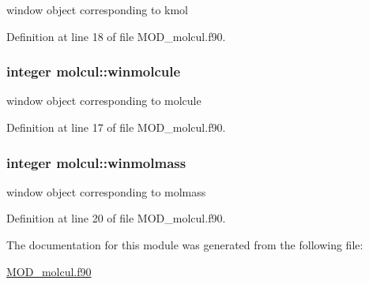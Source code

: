 window object corresponding to kmol 



Definition at line 18 of file M\-O\-D\-\_\-molcul.\-f90.

\hypertarget{classmolcul_a9d2b904765f02dba80da18d3649983d8}{
\subsubsection[{winmolcule}]{\setlength{\rightskip}{0pt plus 5cm}integer molcul\-::winmolcule}}\label{classmolcul_a9d2b904765f02dba80da18d3649983d8}


window object corresponding to molcule 



Definition at line 17 of file M\-O\-D\-\_\-molcul.\-f90.

\hypertarget{classmolcul_a9a1c4cd5046394b3cadb077ff1eb2469}{
\subsubsection[{winmolmass}]{\setlength{\rightskip}{0pt plus 5cm}integer molcul\-::winmolmass}}\label{classmolcul_a9a1c4cd5046394b3cadb077ff1eb2469}


window object corresponding to molmass 



Definition at line 20 of file M\-O\-D\-\_\-molcul.\-f90.



The documentation for this module was generated from the following file\-:\begin{DoxyCompactItemize}
\item 
\hyperlink{MOD__molcul_8f90}{M\-O\-D\-\_\-molcul.\-f90}\end{DoxyCompactItemize}
